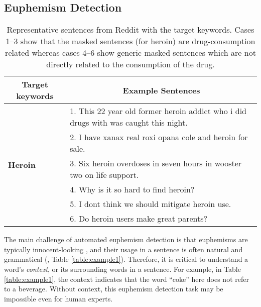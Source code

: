 \subsection{Euphemism Detection}
\begin{table*}[t!]
	\centering
	\small
	\caption{Representative sentences from Reddit with the target keywords. Cases 1--3 show that the masked sentences (for heroin) are drug-consumption related whereas cases 4--6 show generic masked sentences which are not directly related to the consumption of the drug.}
	\begin{tabular}{p{}p{}}
		\toprule
		\multicolumn{1}{c}{\textbf{Target keywords}} &  \multicolumn{1}{c}{\textbf{Example Sentences}} \\
		\midrule
		\multirow{6}{*}{\centering \textbf{\space \space \space \space Heroin}}
		& 1. This 22 year old former heroin addict who i did drugs with was caught this night. \\
		& 2. I have xanax real roxi opana cole and heroin for sale. \\
		& 3. Six heroin overdoses in seven hours in wooster two on life support. \\
		& 4. Why is it so hard to find heroin? \\
		& 5. I dont think we should mitigate heroin use. \\
		& 6. Do heroin users make great parents? \\ 
		\bottomrule
	\end{tabular}
	\label{table:example3}
\end{table*}

The main challenge of automated euphemism detection is that euphemisms are typically innocent-looking  \cite{yuan2018reading}, and their usage in a sentence is often natural and grammatical (\eg, Table \ref{table:example1}). 
Therefore, it is critical to understand a word's \emph{context}, or its surrounding words in a sentence. 
For example, in Table \ref{table:example1}, the context indicates that the word ``coke'' here does not refer to a beverage. 
Without context, this euphemism detection task may be impossible even for  human experts. 

